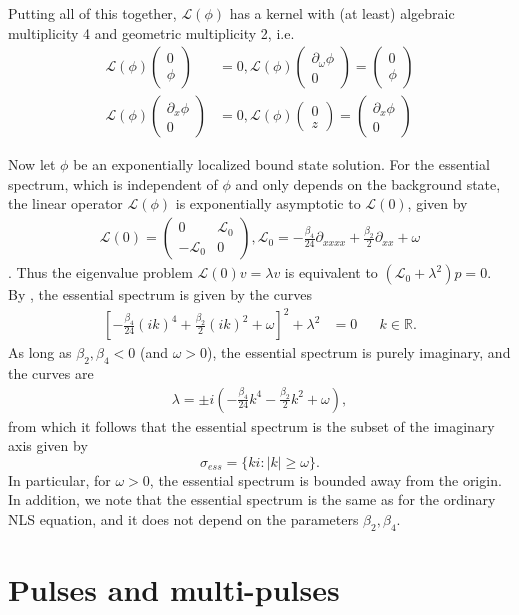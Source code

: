 \documentclass[12pt]{article}
\def\R{{\mathbb R}}
\def\calL{{\mathcal L}}
\begin{document}
Putting all of this together, $\calL(\phi)$ has a kernel with (at least) algebraic multiplicity 4 and geometric multiplicity 2, i.e.
\begin{align*}
\calL(\phi)\begin{pmatrix}0 \\ \phi \end{pmatrix} &= 0, 
\calL(\phi)\begin{pmatrix} \partial_\omega \phi \\ 0 \end{pmatrix} = \begin{pmatrix}0 \\ \phi \end{pmatrix} \\
\calL(\phi)\begin{pmatrix}\partial_x\phi \\ 0 \end{pmatrix} &= 0, 
\calL(\phi)\begin{pmatrix} 0 \\ z \end{pmatrix} = \begin{pmatrix}\partial_x\phi \\ 0 \end{pmatrix} 
\end{align*}

Now let $\phi$ be an exponentially localized bound state solution. For the essential spectrum, which is independent of $\phi$ and only depends on the background state, the linear operator $\calL(\phi)$ is exponentially asymptotic to $\calL(0)$, given by
\begin{align}\label{defL0}
\calL(0) = 
\begin{pmatrix}
0 & \calL_0 \\
-\calL_0 & 0
\end{pmatrix},
\calL_0 = -\frac{\beta_4}{24} \partial_{xxxx} + \frac{\beta_2}{2} \partial_{xx} + \omega
\end{align}.
Thus the eigenvalue problem $\calL(0) v = \lambda v$ is equivalent to $(\calL_0 + \lambda^2)p = 0$. By \cite[Theorem 3.1.13]{Kapitula2013}, the essential spectrum is given by the curves
\begin{align*}
\left[ -\frac{\beta_4}{24} (ik)^4 + \frac{\beta_2}{2}(ik)^2 + \omega \right]^2 + \lambda^2 &= 0 && k \in \R.
\end{align*}
As long as $\beta_2, \beta_4 < 0$ (and $\omega > 0$), the essential spectrum is purely imaginary, and the curves are
\begin{align*}
\lambda = \pm i \left( -\frac{\beta_4}{24}k^4 - \frac{\beta_2}{2}k^2 + \omega \right),
\end{align*}
from which it follows that the essential spectrum is the subset of the imaginary axis given by
\begin{equation}
\sigma_{ess} = \{ k i : |k| \geq \omega \}.
\end{equation}
In particular, for $\omega > 0$, the essential spectrum is bounded away from the origin. In addition, we note that the essential spectrum is the same as for the ordinary NLS equation, and it does not depend on the parameters $\beta_2,\beta_4$.

\section{Pulses and multi-pulses}


% 

\end{document}
